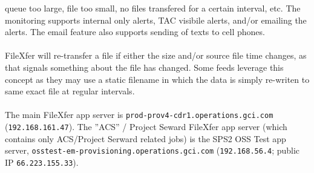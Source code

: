 queue too large, file too small, no files transfered for a
certain interval, etc.  The monitoring supports internal
only alerts, TAC visibile alerts, and/or emailing the alerts.
The email feature also supports sending of texts to cell
phones.\\
\\
FileXfer will re-transfer a file if either the size and/or
source file time changes, as that signals something about the
file has changed.  Some feeds leverage this concept as they
may use a static filename in which the data is simply re-writen
to same exact file at regular intervals.\\
\\
The main FileXfer app server is
\texttt{prod-prov4-cdr1.operations.gci.com}
(\texttt{192.168.161.47}).  The ''ACS'' / Project Seward
FileXfer app server (which contains only ACS/Project
Serward related jobs) is the SPS2 OSS Test app server,
\texttt{osstest-em-provisioning.operations.gci.com}
(\texttt{192.168.56.4}; public IP \texttt{66.223.155.33}).
